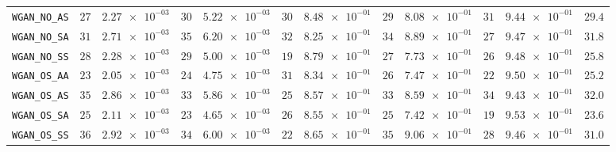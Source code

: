 \begin{xltabular}{\textwidth}{l||cC|cC|cC|cC|cC||c}
	\texttt{WGAN\_NO\_AS} & $ 27$ & $ \num{2.27e-03}$ & $ 30$ & $ \num{5.22e-03}$ & $ 30$ & $ \num{8.48e-01}$ & $ 29$ & $ \num{8.08e-01}$ & $ 31$ & $ \num{9.44e-01}$ & $ 29.4$  \\
	\texttt{WGAN\_NO\_SA} & $ 31$ & $ \num{2.71e-03}$ & $ 35$ & $ \num{6.20e-03}$ & $ 32$ & $ \num{8.25e-01}$ & $ 34$ & $ \num{8.89e-01}$ & $ 27$ & $ \num{9.47e-01}$ & $ 31.8$  \\
	\texttt{WGAN\_NO\_SS} & $ 28$ & $ \num{2.28e-03}$ & $ 29$ & $ \num{5.00e-03}$ & $ 19$ & $ \num{8.79e-01}$ & $ 27$ & $ \num{7.73e-01}$ & $ 26$ & $ \num{9.48e-01}$ & $ 25.8$  \\
	\texttt{WGAN\_OS\_AA} & $ 23$ & $ \num{2.05e-03}$ & $ 24$ & $ \num{4.75e-03}$ & $ 31$ & $ \num{8.34e-01}$ & $ 26$ & $ \num{7.47e-01}$ & $ 22$ & $ \num{9.50e-01}$ & $ 25.2$  \\
	\texttt{WGAN\_OS\_AS} & $ 35$ & $ \num{2.86e-03}$ & $ 33$ & $ \num{5.86e-03}$ & $ 25$ & $ \num{8.57e-01}$ & $ 33$ & $ \num{8.59e-01}$ & $ 34$ & $ \num{9.43e-01}$ & $ 32.0$  \\
	\texttt{WGAN\_OS\_SA} & $ 25$ & $ \num{2.11e-03}$ & $ 23$ & $ \num{4.65e-03}$ & $ 26$ & $ \num{8.55e-01}$ & $ 25$ & $ \num{7.42e-01}$ & $ 19$ & $ \num{9.53e-01}$ & $ 23.6$  \\
	\texttt{WGAN\_OS\_SS} & $ 36$ & $ \num{2.92e-03}$ & $ 34$ & $ \num{6.00e-03}$ & $ 22$ & $ \num{8.65e-01}$ & $ 35$ & $ \num{9.06e-01}$ & $ 28$ & $ \num{9.46e-01}$ & $ 31.0$  \\

\end{xltabular}
